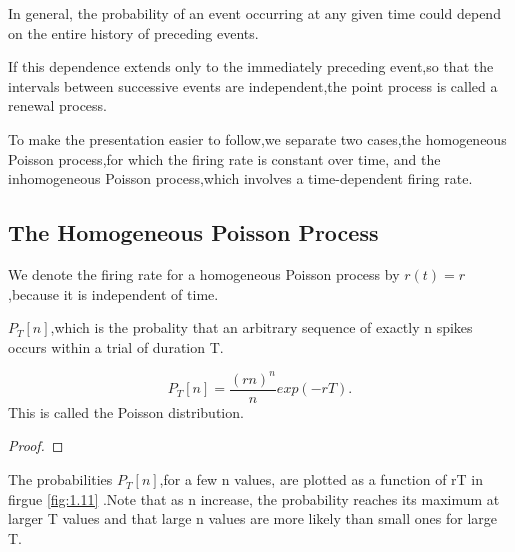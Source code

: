 \begin{defn}
    In general, the probability of an event occurring at any given time could depend on the entire history of preceding events. 
\end{defn}

\begin{defn}
    If this dependence extends only to the immediately preceding event,so that the intervals between successive events are independent,the point process is called a renewal process.
\end{defn}


\begin{defn}
    To make the presentation easier to follow,we separate two cases,the homogeneous Poisson process,for which the firing rate is constant over time, and the inhomogeneous Poisson process,which involves a time-dependent firing rate.
\end{defn}

\subsection{The Homogeneous Poisson Process}

\begin{defn}
    We denote the firing rate for a homogeneous Poisson process by $r(t)=r$,because it is independent of time.
\end{defn}

\begin{defn}
    $P_T[n]$,which is the probality that an arbitrary sequence of exactly n spikes occurs within a trial of duration T.    
\end{defn}

\begin{thm}
    \begin{equation}
        P_T[n]=\frac{(rn)^n}{n}exp(-rT).
        \label{eq:1.29}
    \end{equation}
    This is called the Poisson distribution.
    \begin{proof}
    \end{proof}
\end{thm}

\begin{exm}
    The probabilities $P_T[n]$,for a few n values, are plotted as a function of rT in  firgue \ref{fig:1.11} .Note that as n increase, the probability reaches its maximum at larger T values and that large n values are more likely than small ones for large T.
\end{exm}    

